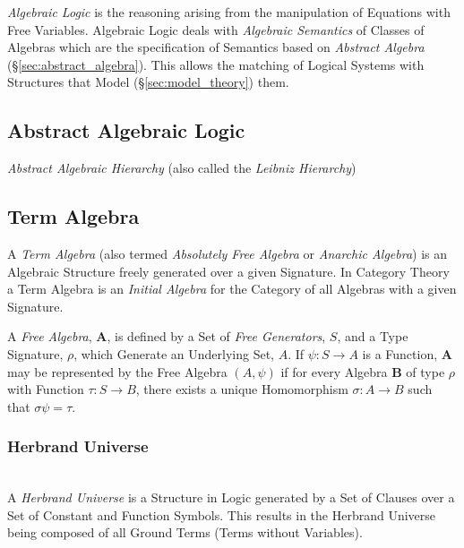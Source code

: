 \documentclass{article}
\begin{document}
\emph{Algebraic Logic} is the reasoning arising from the manipulation
of Equations with Free Variables. Algebraic Logic deals with
\emph{Algebraic Semantics} of Classes of Algebras which are the
specification of Semantics based on \emph{Abstract Algebra}
(\S\ref{sec:abstract_algebra}). This allows the matching of Logical
Systems with Structures that Model (\S\ref{sec:model_theory}) them.

\subsection{Abstract Algebraic Logic}

\emph{Abstract Algebraic Hierarchy} (also called the \emph{Leibniz Hierarchy})

\subsection{Term Algebra}\label{subsec:term_algebra}

A \emph{Term Algebra} (also termed \emph{Absolutely Free Algebra} or
\emph{Anarchic Algebra}) is an Algebraic Structure freely generated
over a given Signature. In Category Theory a Term Algebra is an
\emph{Initial Algebra} for the Category of all Algebras with a given
Signature.

A \emph{Free Algebra}, $\mathbf{A}$, is defined by a Set of \emph{Free
  Generators}, $S$, and a Type Signature, $\rho$, which Generate an
Underlying Set, $A$. If $\psi : S \rightarrow A$ is a Function,
$\mathbf{A}$ may be represented by the Free Algebra $(A,\psi)$ if for
every Algebra $\mathbf{B}$ of type $\rho$ with Function $\tau : S
\rightarrow B$, there exists a unique Homomorphism $\sigma : A
\rightarrow B$ such that $\sigma\psi = \tau$.

\subsubsection{Herbrand Universe}\label{subsec:herbrand_universe}
\hfill \\
A \emph{Herbrand Universe} is a Structure in Logic generated by a Set
of Clauses over a Set of Constant and Function Symbols. This results
in the Herbrand Universe being composed of all Ground Terms (Terms
without Variables).
\end{document}
